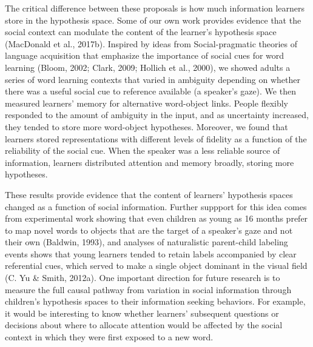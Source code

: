 \documentclass[oneside]{report}
\begin{document}
The critical difference between these proposals is how much information
learners store in the hypothesis space. Some of our own work provides
evidence that the social context can modulate the content of the
learner's hypothesis space (MacDonald et al., 2017b). Inspired by ideas
from Social-pragmatic theories of language acquisition that emphasize
the importance of social cues for word learning (Bloom, 2002; Clark,
2009; Hollich et al., 2000), we showed adults a series of word learning
contexts that varied in ambiguity depending on whether there was a
useful social cue to reference available (a speaker's gaze). We then
measured learners' memory for alternative word-object links. People
flexibly responded to the amount of ambiguity in the input, and as
uncertainty increased, they tended to store more word-object hypotheses.
Moreover, we found that learners stored representations with different
levels of fidelity as a function of the reliability of the social cue.
When the speaker was a less reliable source of information, learners
distributed attention and memory broadly, storing more hypotheses.

These results provide evidence that the content of learners' hypothesis
spaces changed as a function of social information. Further suppport for
this idea comes from experimental work showing that even children as
young as 16 months prefer to map novel words to objects that are the
target of a speaker's gaze and not their own (Baldwin, 1993), and
analyses of naturalistic parent-child labeling events shows that young
learners tended to retain labels accompanied by clear referential cues,
which served to make a single object dominant in the visual field (C. Yu
\& Smith, 2012a). One important direction for future research is to
measure the full causal pathway from variation in social information
through children's hypothesis spaces to their information seeking
behaviors. For example, it would be interesting to know whether
learners' subsequent questions or decisions about where to allocate
attention would be affected by the social context in which they were
first exposed to a new word.
\end{document}
